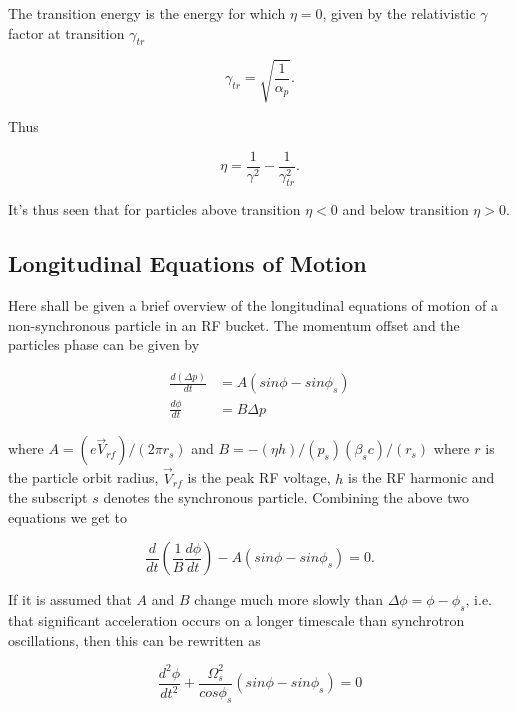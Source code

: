 The transition energy is the energy for which $\eta=0$, given by the relativistic $\gamma$ factor at transition $\gamma_{tr}$

\begin{equation}
\gamma_{tr} = \sqrt{\frac{1}{\alpha_{p}}}.
\end{equation}

Thus 

\begin{equation}
\eta = \frac{1}{\gamma^{2}} - \frac{1}{\gamma_{tr}^{2}}.
\end{equation}

It's thus seen that for particles above transition $\eta < 0$ and below transition $\eta > 0$.

\subsection{Longitudinal Equations of Motion}

Here shall be given a brief overview of the longitudinal equations of motion of a non-synchronous particle in an RF bucket. The momentum offset and the particles phase can be given by

\begin{align}
\frac{d\left( \Delta p \right)}{dt} & =  A\left( sin \phi - sin \phi_{s} \right) \\
\frac{d\phi}{dt} & =  B \Delta p
\end{align}

where $A=(e\vec{V}_{rf})/(2\pi r_{s})$ and $B=-(\eta h)/(p_{s})(\beta_{s}c)/(r_{s})$ where $r$ is the particle orbit radius, $\vec{V}_{rf}$ is the peak RF voltage, $h$ is the RF harmonic and the subscript $s$ denotes the synchronous particle. Combining the above two equations we get to

\begin{equation}
\frac{d}{dt}\left( \frac{1}{B} \frac{d\phi}{dt} \right) - A \left( sin \phi - sin \phi_{s} \right) = 0
\label{eqn:GenLongMot}.
\end{equation}

If it is assumed that $A$ and $B$ change much more slowly than $\Delta \phi = \phi - \phi_{s}$, i.e. that significant acceleration occurs on a longer timescale than synchrotron oscillations, then this can be rewritten as

\begin{equation}
\frac{d^{2}\phi}{dt^{2}} + \frac{\Omega_{s}^{2}}{cos \phi_{s}} \left( sin\phi - sin\phi_{s} \right) = 0
\label{eqn:phiEOM}
\end{equation}

